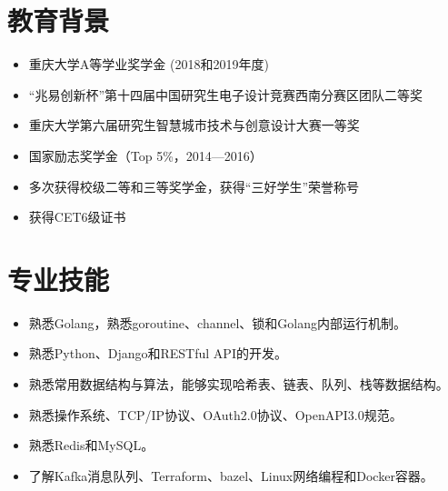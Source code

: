 \documentclass{resume}
\begin{document}




\section{教育背景}
\begin{itemize}
  \item 重庆大学A等学业奖学金 (2018和2019年度)
  \item “兆易创新杯”第十四届中国研究生电子设计竞赛西南分赛区团队二等奖
  \item 重庆大学第六届研究生智慧城市技术与创意设计大赛一等奖
\end{itemize}
\begin{itemize}
  \item 国家励志奖学金（Top 5\%，2014—2016）
  \item 多次获得校级二等和三等奖学金，获得“三好学生”荣誉称号
  \item 获得CET6级证书
\end{itemize}

\section{专业技能}
\begin{itemize}[parsep=0.2ex]
  \item 熟悉Golang，熟悉goroutine、channel、锁和Golang内部运行机制。
  \item 熟悉Python、Django和RESTful API的开发。
  \item 熟悉常用数据结构与算法，能够实现哈希表、链表、队列、栈等数据结构。
  \item 熟悉操作系统、TCP/IP协议、OAuth2.0协议、OpenAPI3.0规范。
  \item 熟悉Redis和MySQL。
  \item 了解Kafka消息队列、Terraform、bazel、Linux网络编程和Docker容器。
\end{itemize}
\end{document}
